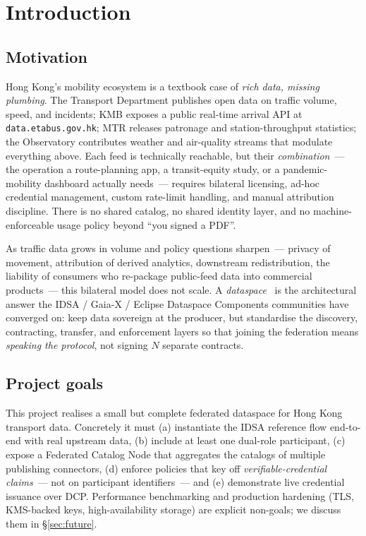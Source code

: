 \documentclass[11pt,a4paper]{article}
\DeclareRobustCommand{\code}[1]{\texttt{\small #1}}
\begin{document}
\section{Introduction}

\subsection{Motivation}

Hong Kong's mobility ecosystem is a textbook case of \emph{rich data, missing
plumbing}. The Transport Department publishes open data on traffic volume,
speed, and incidents; KMB exposes a public real-time arrival API at
\code{data.etabus.gov.hk}; MTR releases patronage and station-throughput
statistics; the Observatory contributes weather and air-quality streams that
modulate everything above. Each feed is technically reachable, but their
\emph{combination}~--- the operation a route-planning app, a transit-equity
study, or a pandemic-mobility dashboard actually needs~--- requires bilateral
licensing, ad-hoc credential management, custom rate-limit handling, and
manual attribution discipline. There is no shared catalog, no shared identity
layer, and no machine-enforceable usage policy beyond ``you signed a PDF''.

As traffic data grows in volume and policy questions sharpen~--- privacy of
movement, attribution of derived analytics, downstream redistribution, the
liability of consumers who re-package public-feed data into commercial
products~--- this bilateral model does not scale. A
\emph{dataspace}~\cite{idsa-ram4} is the architectural answer the
IDSA / Gaia-X / Eclipse Dataspace Components communities have converged on:
keep data sovereign at the producer, but standardise the discovery,
contracting, transfer, and enforcement layers so that joining the federation
means \emph{speaking the protocol}, not signing $N$ separate contracts.

\subsection{Project goals}

This project realises a small but complete federated dataspace for Hong Kong
transport data. Concretely it must (a) instantiate the IDSA reference flow
end-to-end with real upstream data, (b) include at least one dual-role
participant, (c) expose a Federated Catalog Node that aggregates the
catalogs of multiple publishing connectors, (d) enforce policies that
key off
\emph{verifiable-credential claims}~--- not on participant identifiers~---
and (e) demonstrate live credential issuance over DCP. Performance
benchmarking and production hardening (TLS, KMS-backed keys,
high-availability storage) are explicit non-goals; we discuss them in §\ref{sec:future}.
\end{document}
